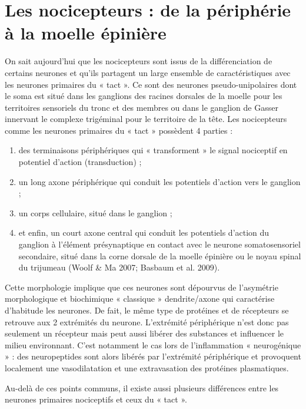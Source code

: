 \documentclass[a4paper,12pt,twoside]{report}
\begin{document}
\section{Les nocicepteurs : de la périphérie à la moelle épinière}
\label{Nocicepteurs : de la périphérie à la moelle}

On sait aujourd’hui que les nocicepteurs sont issus de la différenciation de certains neurones et qu’ils partagent un large ensemble de caractéristiques avec les neurones primaires du « tact ». Ce sont des neurones pseudo-unipolaires dont le soma est situé dans les ganglions des racines dorsales de la moelle pour les territoires sensoriels du tronc et des membres ou dans le ganglion de Gasser innervant le complexe trigéminal pour le territoire de la tête. Les nocicepteurs comme les neurones primaires du « tact » possèdent 4 parties :

\begin{enumerate}
\item des terminaisons périphériques qui « transforment » le signal nociceptif en potentiel d'action (transduction) ;
\item un long axone périphérique qui conduit les potentiels d'action vers le ganglion ;
\item un corps cellulaire, situé dans le ganglion ; 
\item et enfin, un court axone central qui conduit les potentiels d'action du ganglion à l'élément présynaptique en contact avec le neurone somatosensoriel secondaire, situé dans la corne dorsale de la moelle épinière ou le noyau spinal du trijumeau (Woolf \& Ma 2007; Basbaum et al. 2009). \end{enumerate}

Cette morphologie implique que ces neurones sont dépourvus de l’asymétrie morphologique et biochimique « classique » dendrite/axone qui caractérise d’habitude les neurones. De fait, le même type de protéines et de récepteurs se retrouve aux 2 extrémités du neurone. L’extrémité périphérique n’est donc pas seulement un récepteur mais peut aussi libérer des substances et influencer le milieu environnant. C’est notamment le cas lors de l’inflammation « neurogénique » : des neuropeptides sont alors libérés par l’extrémité périphérique et provoquent localement une vasodilatation et une extravasation des protéines plasmatiques.

\bigskip 

Au-delà de ces points communs, il existe aussi plusieurs différences entre les neurones primaires nociceptifs et ceux du « tact ».
\end{document}
